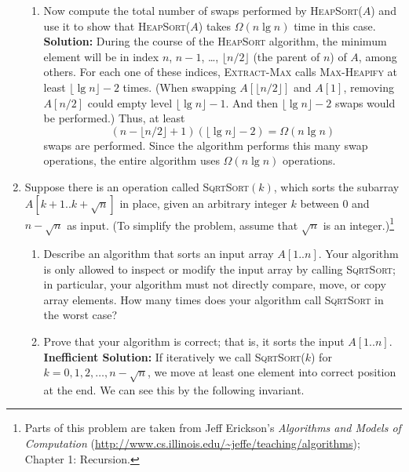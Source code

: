 \documentclass[letterpaper,11pt]{article}
\begin{document}
\begin{enumerate}
\begin{enumerate}

\item Now compute the total number of swaps performed by \textsc{HeapSort}($A$) and use it to show that \textsc{HeapSort}($A$) takes $\Omega(n\lg n)$ time in this case.\\

{\bf Solution:} During the course of the \textsc{HeapSort} algorithm, the minimum element will be in index $n$, $n-1$, \ldots, $\lfloor n/2\rfloor$ (the parent of $n$) of $A$, among others. For each one of these indices, \textsc{Extract-Max} calls \textsc{Max-Heapify} at least $\lfloor \lg n\rfloor-2$ times. (When swapping $A[\lfloor n/2\rfloor]$ and $A[1]$, removing $A[n/2]$ could empty level $\lfloor\lg n\rfloor - 1$. And then $\lfloor\lg n\rfloor - 2$ swaps would be performed.) Thus, at least
\[(n - \lfloor n/2\rfloor + 1)(\lfloor\lg n \rfloor -2) = \Omega(n\lg n)\]
swaps are performed. Since the algorithm performs this many swap operations, the entire algorithm uses $\Omega(n\lg n)$ operations.

\end{enumerate}

\newpage

\item  Suppose there is an operation called
\textsc{SqrtSort}$(k)$, which sorts the subarray $A[k + 1..k + \sqrt{n}]$
in place, given an arbitrary
integer $k$ between $0$ and $n - \sqrt{n}$ as input. (To simplify the problem, assume that $\sqrt{n}$
is an integer.)\footnote{Parts of this problem are taken from Jeff Erickson's \emph{Algorithms and Models of Computation} (\url{http://www.cs.illinois.edu/~jeffe/teaching/algorithms}); Chapter 1: Recursion.}

\begin{enumerate}
\item Describe an algorithm that sorts an input array $A[1..n]$. Your algorithm is only allowed to inspect or modify the input array
by calling \textsc{SqrtSort}; in particular, your algorithm must not directly compare, move,
or copy array elements.  How many times does your algorithm call \textsc{SqrtSort} in the worst case?
\item Prove that your algorithm is correct; that is, it sorts the input $A[1..n]$.\\

{\bf Inefficient Solution:} If iteratively we call \textsc{SqrtSort}($k$) for $k =0,1,2,\ldots, n-\sqrt{n}$, we move at least one element into correct position at the end. We can see this by the following invariant.


\end{enumerate}
\end{enumerate}
\end{document}
